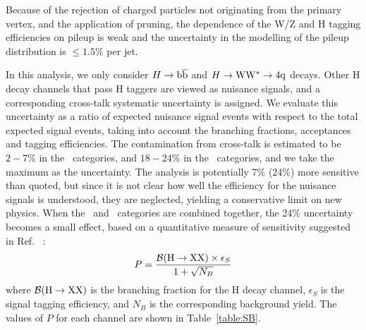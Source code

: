 Because of the rejection of charged
particles not originating from the primary vertex, and the application
of pruning, the dependence of the W/Z and H tagging 
efficiencies on
pileup is weak and the uncertainty in the modelling of the pileup
distribution is $\leq 1.5\%$ per jet. 

In this analysis, we only consider $H\to\mathrm{b\overline{b}}$ and $H\to{\rm W}{\rm W}^*\to4{\rm q}$ decays. 
Other H decay channels that pass H taggers are viewed
 as nuisance signals, 
and a corresponding cross-talk systematic uncertainty is assigned.
We evaluate this uncertainty as a ratio of expected nuisance signal
events 
with respect to the 
total expected signal events, taking into account
the branching fractions, acceptances and tagging efficiencies.  
The contamination from cross-talk is estimated to be $2 - 7\%$
in the \HbbAll\ categories, and $18 - 24\%$ in the \HWWAll\ categories, and 
we take the maximum as the uncertainty. 
The analysis is potentially 7\% (24\%) more sensitive than quoted,
 but since it is not clear how well the efficiency for
 the nuisance signals is understood,
 they are neglected, yielding a conservative limit on new physics. 
When the \HbbAll\ and \HWWAll\ categories are combined together, 
the 24\% uncertainty 
becomes a small effect, based on a quantitative measure of 
sensitivity 
 suggested in Ref.~\cite{punzi} :
\begin{equation}
P = \frac{{\rm \mathcal{B}(H \to XX)} \times \epsilon_{S}}{1+\sqrt{N_B}}
\end{equation}
where ${\rm \mathcal{B}(H \to XX)}$ is the branching fraction for 
the H decay channel, $\epsilon_{S}$ is the signal tagging efficiency, 
and $N_B$ is the corresponding background
yield.
The values of $P$ for each channel are shown in Table~\ref{table:SB}.

